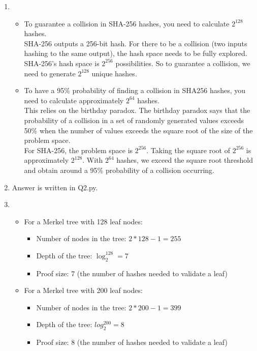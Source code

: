 \documentclass{report}
\begin{document}
\begin{enumerate}
	\item \begin{itemize}
		\item To guarantee a collision in SHA-256 hashes, you need to calculate $2^{128}$ hashes.\\
		SHA-256 outputs a 256-bit hash. For there to be a collision (two inputs hashing to the same output), the hash space needs to be fully explored. SHA-256's hash space is $2^{256}$ possibilities. So to guarantee a collision, we need to generate $2^{128}$ unique hashes.
		\item To have a 95\% probability of finding a collision in SHA256 hashes, you need to calculate approximately $2^{64}$ hashes.\\
		This relies on the birthday paradox. The birthday paradox says that the probability of a collision in a set of randomly generated values exceeds 50\% when the number of values exceeds the square root of the size of the problem space.\\
		For SHA-256, the problem space is $2^{256}$. Taking the square root of $2^{256}$ is approximately $2^{128}$. With $2^{64}$ hashes, we exceed the square root threshold and obtain around a 95\% probability of a collision occurring.
	\end{itemize} 
	\item Answer is written in Q2.py.
	\item \begin{itemize}
		\item For a Merkel tree with 128 leaf nodes:
		\begin{itemize}
			\item Number of nodes in the tree: $2 * 128 - 1 = 255$
			\item Depth of the tree: $\log_{2}^{128} = 7$
			\item Proof size: 7 (the number of hashes needed to validate a leaf)
		\end{itemize}
		\item For a Merkel tree with 200 leaf nodes:
		\begin{itemize}
			\item Number of nodes in the tree: $2 * 200 - 1 = 399$
			\item Depth of the tree: $log_{2}^{200} = 8$
			\item Proof size: 8 (the number of hashes needed to validate a leaf)
		\end{itemize}
	\end{itemize}

\end{enumerate}
\end{document}
